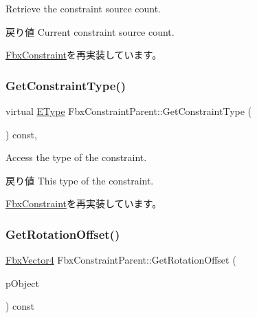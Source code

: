 Retrieve the constraint source count. \begin{DoxyReturn}{戻り値}
Current constraint source count. 
\end{DoxyReturn}


\hyperlink{class_fbx_constraint_aa702f86c6a1832ce3b4905911e66c58f}{Fbx\+Constraint}を再実装しています。

\mbox{\label{class_fbx_constraint_parent_a02f6bd2dda6447a23d81d82ce06b73f0}} 
\subsubsection{\texorpdfstring{Get\+Constraint\+Type()}{GetConstraintType()}}
{\footnotesize\ttfamily virtual \hyperlink{class_fbx_constraint_a49c1634663395eab7c28856df233ec66}{E\+Type} Fbx\+Constraint\+Parent\+::\+Get\+Constraint\+Type (\begin{DoxyParamCaption}{ }\end{DoxyParamCaption}) const\hspace{0.3cm}{\ttfamily [protected]}, {\ttfamily [virtual]}}

Access the type of the constraint. \begin{DoxyReturn}{戻り値}
This type of the constraint. 
\end{DoxyReturn}


\hyperlink{class_fbx_constraint_adbeea66a1a605531a019aa6df90dc45b}{Fbx\+Constraint}を再実装しています。

\mbox{\label{class_fbx_constraint_parent_a35f64fd4fccedbd4070d5e2bdb9ce06b}} 
\subsubsection{\texorpdfstring{Get\+Rotation\+Offset()}{GetRotationOffset()}}
{\footnotesize\ttfamily \hyperlink{class_fbx_vector4}{Fbx\+Vector4} Fbx\+Constraint\+Parent\+::\+Get\+Rotation\+Offset (\begin{DoxyParamCaption}\item[{const \hyperlink{class_fbx_object}{Fbx\+Object} $\ast$}]{p\+Object }\end{DoxyParamCaption}) const}

